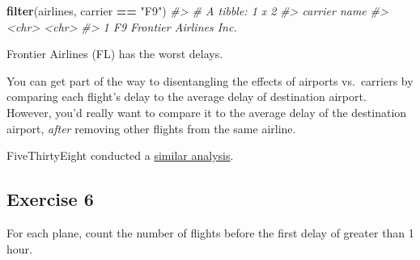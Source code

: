 \documentclass[]{book}
\newenvironment{Shaded}{\begin{snugshade}}{\end{snugshade}}
\newcommand{\CommentTok}[1]{\textcolor[rgb]{0.56,0.35,0.01}{\textit{#1}}}
\newcommand{\DataTypeTok}[1]{\textcolor[rgb]{0.13,0.29,0.53}{#1}}
\newcommand{\KeywordTok}[1]{\textcolor[rgb]{0.13,0.29,0.53}{\textbf{#1}}}
\newcommand{\NormalTok}[1]{#1}
\newcommand{\OperatorTok}[1]{\textcolor[rgb]{0.81,0.36,0.00}{\textbf{#1}}}
\newcommand{\OtherTok}[1]{\textcolor[rgb]{0.56,0.35,0.01}{#1}}
\newcommand{\StringTok}[1]{\textcolor[rgb]{0.31,0.60,0.02}{#1}}
\theoremstyle{plain}
\theoremstyle{remark}
\theoremstyle{definition}
\theoremstyle{definition}
\theoremstyle{definition}
\theoremstyle{remark}
\begin{document}
\begin{Shaded}
\end{Shaded}

\begin{Shaded}
\begin{Highlighting}[]
\KeywordTok{filter}\NormalTok{(airlines, carrier }\OperatorTok{==}\StringTok{ "F9"}\NormalTok{)}
\CommentTok{#> # A tibble: 1 x 2}
\CommentTok{#>   carrier name                  }
\CommentTok{#>   <chr>   <chr>                 }
\CommentTok{#> 1 F9      Frontier Airlines Inc.}
\end{Highlighting}
\end{Shaded}

Frontier Airlines (FL) has the worst delays.

You can get part of the way to disentangling the effects of airports
vs.~carriers by comparing each flight's delay to the average delay of
destination airport. However, you'd really want to compare it to the
average delay of the destination airport, \emph{after} removing other
flights from the same airline.

FiveThirtyEight conducted a
\href{http://fivethirtyeight.com/features/the-best-and-worst-airlines-airports-and-flights-summer-2015-update/}{similar
analysis}.

\hypertarget{exercise-6-3}{%
\subsection{Exercise 6}\label{exercise-6-3}}

For each plane, count the number of flights before the first delay of
greater than 1 hour.
\end{document}
